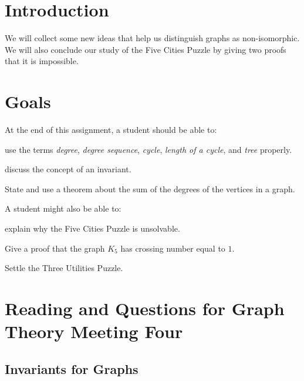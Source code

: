 \documentclass[12pt,letterpaper]{article}
\theoremstyle{definition}
\begin{document}
\setlength{\parskip}{1ex plus 0.5ex minus 0.2ex}
\setlength{\parindent}{0pt}

\pagestyle{fancy}
\cfoot{}

\section*{Introduction}

We will collect some new ideas that help us distinguish graphs as non-isomorphic. We will also conclude our
study of the Five Cities Puzzle by giving two proofs that it is impossible.

\section*{Goals}
At the end of this assignment, a student should be able to:
\begin{compactitem}
\item use the terms \emph{degree}, \emph{degree sequence}, \emph{cycle}, \emph{length of a cycle}, and \emph{tree} properly.
\item discuss the concept of an invariant.
\item State and use a theorem about the sum of the degrees of the vertices in a graph.
\end{compactitem}
A student might also be able to:
\begin{compactitem}
\item explain why the Five Cities Puzzle is unsolvable.
\item Give a proof that the graph $K_5$ has crossing number equal to $1$.
\item Settle the Three Utilities Puzzle.
\end{compactitem}

\section*{Reading and Questions for Graph Theory Meeting Four}

\subsection*{Invariants for Graphs}
\end{document}
